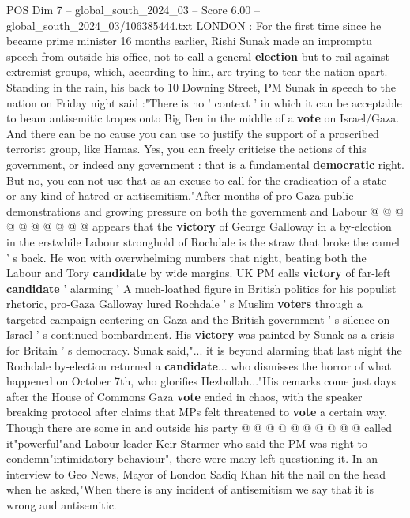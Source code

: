 \begin{textsample}{POS Dim 7 – global\_south\_2024\_03 – Score 6.00 – global\_south\_2024\_03/106385444.txt}  \label{ex:f7_pos_164}
LONDON : For the first time since he became prime minister 16 months earlier, Rishi Sunak made an impromptu speech from outside his office, not to call a general \textbf{election} but to rail against extremist groups, which, according to him, are trying to tear the nation apart.
Standing in the rain, his back to 10 Downing Street, PM Sunak in speech to the nation on Friday night said :"There is no ' context ' in which it can be acceptable to beam antisemitic tropes onto Big Ben in the middle of a \textbf{vote} on Israel/Gaza.
And there can be no cause you can use to justify the support of a proscribed terrorist group, like Hamas.
Yes, you can freely criticise the actions of this government, or indeed any government : that is a fundamental \textbf{democratic} right.
But no, you can not use that as an excuse to call for the eradication of a state -- or any kind of hatred or antisemitism."After months of pro-Gaza public demonstrations and growing pressure on both the government and Labour @ @ @ @ @ @ @ @ @ @ appears that the \textbf{victory} of George Galloway in a by-election in the erstwhile Labour stronghold of Rochdale is the straw that broke the camel ' s back.
He won with overwhelming numbers that night, beating both the Labour and Tory \textbf{candidate} by wide margins.
UK PM calls \textbf{victory} of far-left \textbf{candidate} ' alarming ' A much-loathed figure in British politics for his populist rhetoric, pro-Gaza Galloway lured Rochdale ' s Muslim \textbf{voters} through a targeted campaign centering on Gaza and the British government ' s silence on Israel ' s continued bombardment.
His \textbf{victory} was painted by Sunak as a crisis for Britain ' s democracy.
Sunak said,"... it is beyond alarming that last night the Rochdale by-election returned a \textbf{candidate}... who dismisses the horror of what happened on October 7th, who glorifies Hezbollah..."His remarks come just days after the House of Commons Gaza \textbf{vote} ended in chaos, with the speaker breaking protocol after claims that MPs felt threatened to \textbf{vote} a certain way.
Though there are some in and outside his party @ @ @ @ @ @ @ @ @ @ called it"powerful"and Labour leader Keir Starmer who said the PM was right to condemn"intimidatory behaviour", there were many left questioning it.
In an interview to Geo News, Mayor of London Sadiq Khan hit the nail on the head when he asked,"When there is any incident of antisemitism we say that it is wrong and antisemitic.

\end{textsample}
